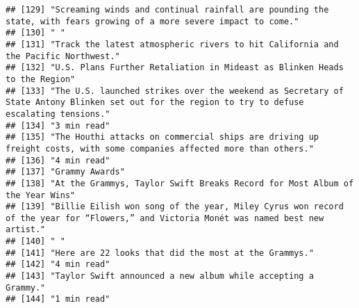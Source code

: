 \documentclass[
]{article}
\begin{document}
\begin{verbatim}
## [129] "Screaming winds and continual rainfall are pounding the state, with fears growing of a more severe impact to come."                                       
## [130] " "                                                                                                                                                        
## [131] "Track the latest atmospheric rivers to hit California and the Pacific Northwest."                                                                         
## [132] "U.S. Plans Further Retaliation in Mideast as Blinken Heads to the Region"                                                                                 
## [133] "The U.S. launched strikes over the weekend as Secretary of State Antony Blinken set out for the region to try to defuse escalating tensions."             
## [134] "3 min read"                                                                                                                                               
## [135] "The Houthi attacks on commercial ships are driving up freight costs, with some companies affected more than others."                                      
## [136] "4 min read"                                                                                                                                               
## [137] "Grammy Awards"                                                                                                                                            
## [138] "At the Grammys, Taylor Swift Breaks Record for Most Album of the Year Wins"                                                                               
## [139] "Billie Eilish won song of the year, Miley Cyrus won record of the year for “Flowers,” and Victoria Monét was named best new artist."                      
## [140] " "                                                                                                                                                        
## [141] "Here are 22 looks that did the most at the Grammys."                                                                                                      
## [142] "4 min read"                                                                                                                                               
## [143] "Taylor Swift announced a new album while accepting a Grammy."                                                                                             
## [144] "1 min read"                                                                                                                                               

\end{verbatim}
\end{document}
